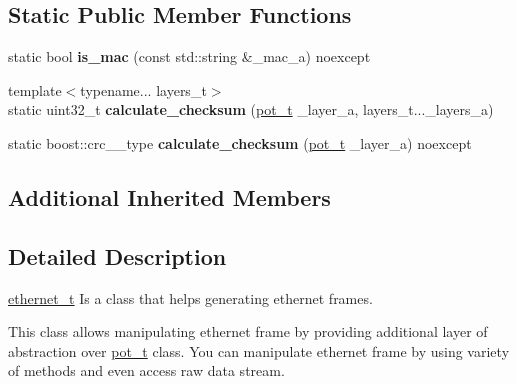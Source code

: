 \subsection*{Static Public Member Functions}
\begin{DoxyCompactItemize}
\item 
\hypertarget{class_n_h_1_1_protocols_1_1_raw_1_1ethernet__t_a77b77348cbc3de9b6d7787e14c3fe77f}{static bool {\bfseries is\+\_\+mac} (const std\+::string \&\+\_\+mac\+\_\+a) noexcept}\label{class_n_h_1_1_protocols_1_1_raw_1_1ethernet__t_a77b77348cbc3de9b6d7787e14c3fe77f}

\item 
\hypertarget{class_n_h_1_1_protocols_1_1_raw_1_1ethernet__t_a54278f10d6f9b167c906f2324ef65a88}{{\footnotesize template$<$typename... layers\+\_\+t$>$ }\\static uint32\+\_\+t {\bfseries calculate\+\_\+checksum} (\hyperlink{class_n_h_1_1_protocols_1_1_raw_1_1pot__t}{pot\+\_\+t} \+\_\+layer\+\_\+a, layers\+\_\+t...\+\_\+layers\+\_\+a)}\label{class_n_h_1_1_protocols_1_1_raw_1_1ethernet__t_a54278f10d6f9b167c906f2324ef65a88}

\item 
\hypertarget{class_n_h_1_1_protocols_1_1_raw_1_1ethernet__t_ab3b5d70113f0b835b0e5b3914935afb0}{static boost\+::crc\+\_\+\_\+type {\bfseries calculate\+\_\+checksum} (\hyperlink{class_n_h_1_1_protocols_1_1_raw_1_1pot__t}{pot\+\_\+t} \+\_\+layer\+\_\+a) noexcept}\label{class_n_h_1_1_protocols_1_1_raw_1_1ethernet__t_ab3b5d70113f0b835b0e5b3914935afb0}

\end{DoxyCompactItemize}
\subsection*{Additional Inherited Members}


\subsection{Detailed Description}
\hyperlink{class_n_h_1_1_protocols_1_1_raw_1_1ethernet__t}{ethernet\+\_\+t} Is a class that helps generating ethernet frames. 

This class allows manipulating ethernet frame by providing additional layer of abstraction over \hyperlink{class_n_h_1_1_protocols_1_1_raw_1_1pot__t}{pot\+\_\+t} class. You can manipulate ethernet frame by using variety of methods and even access raw data stream. 

